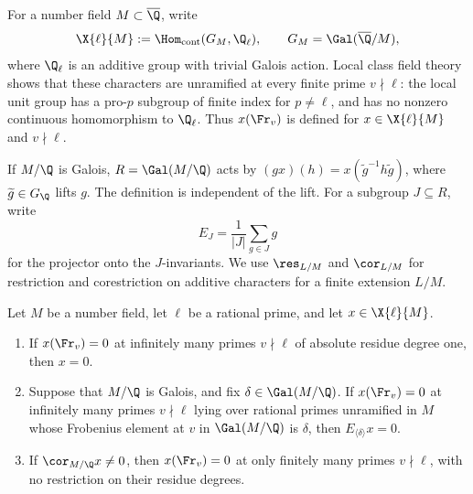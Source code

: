 For a number field $M\subset\overline{\Q}$, write
\[
 \X{\ell}{M}:=\Hom_{\mathrm{cont}}(G_M,\Q_\ell),
 \qquad G_M=\Gal(\overline{\Q}/M),
\]
where $\Q_\ell$ is an additive group with trivial Galois action.
Local class field theory shows that these characters are unramified
at every finite prime $v\nmid\ell$: the local unit group has a
pro-$p$ subgroup of finite index for $p\ne\ell$, and has no
nonzero continuous homomorphism to $\Q_\ell$.  Thus
$x(\Fr_v)$ is defined for $x\in\X{\ell}{M}$ and $v\nmid\ell$.

If $M/\Q$ is Galois, $R=\Gal(M/\Q)$ acts by
$(g x)(h)=x(\widetilde g^{-1}h\widetilde g)$, where
$\widetilde g\in G_\Q$ lifts $g$.  The definition is independent
of the lift.  For a subgroup $J\subseteq R$, write
\[
 E_J=\frac1{|J|}\sum_{g\in J}g
\]
for the projector onto the $J$-invariants.  We use
$\res_{L/M}$ and $\cor_{L/M}$ for restriction and corestriction
on additive characters for a finite extension $L/M$.

\begin{proposition}\label{prop:character-detection}
Let $M$ be a number field, let $\ell$ be a rational prime, and let
$x\in\X{\ell}{M}$.
\begin{enumerate}
\item[(i)] If $x(\Fr_v)=0$ at infinitely many primes $v\nmid\ell$
of absolute residue degree one, then $x=0$.
\item[(ii)] Suppose that $M/\Q$ is Galois, and fix
$\delta\in\Gal(M/\Q)$.  If $x(\Fr_v)=0$ at infinitely many
primes $v\nmid\ell$ lying over rational primes unramified in $M$
whose Frobenius element at $v$ in $\Gal(M/\Q)$ is $\delta$, then
$E_{\langle\delta\rangle}x=0$.
\item[(iii)] If $\cor_{M/\Q}x\ne0$, then
$x(\Fr_v)=0$ at only finitely many primes $v\nmid\ell$, with no
restriction on their residue degrees.
\end{enumerate}
\end{proposition}

